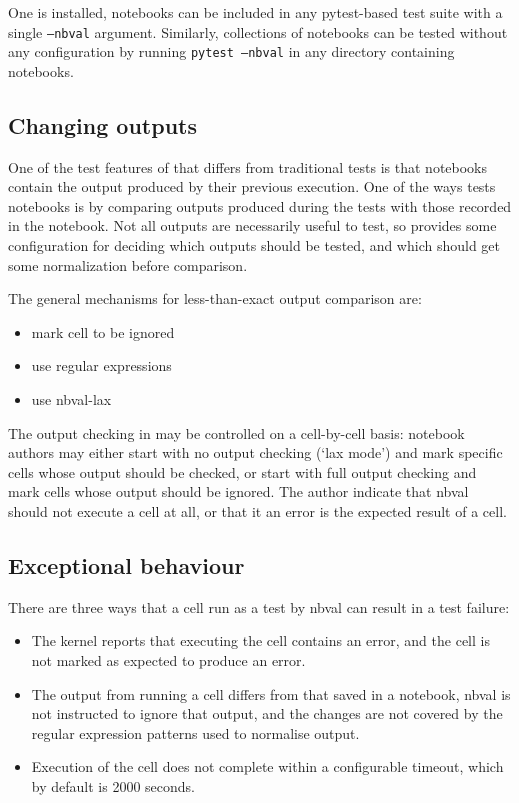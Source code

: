 \documentclass{deliverablereport}
\begin{document}
One \nbval is installed, notebooks can be included in any pytest-based test suite
with a single \texttt{--nbval} argument.
Similarly, collections of notebooks can be tested without any configuration by running
\texttt{pytest --nbval} in any directory containing notebooks.


\subsection{Changing outputs}\label{sec:changing-outputs}

One of the test features of \nbval that differs from traditional tests
is that notebooks contain the output produced by their previous execution.
One of the ways \nbval tests notebooks is by comparing outputs produced during the tests
with those recorded in the notebook.
Not all outputs are necessarily useful to test,
so \nbval provides some configuration for deciding which outputs should be tested,
and which should get some normalization before comparison.

The general mechanisms for less-than-exact output comparison are:

\begin{itemize}
\item mark cell to be ignored
\item use regular expressions
\item use nbval-lax
\end{itemize}

The output checking in \nbval may be controlled on a cell-by-cell
basis: notebook authors may either start with no output checking (`lax
mode') and mark specific cells whose output should be checked, or
start with full output checking and mark cells whose output should be
ignored.  The author indicate that nbval should not execute a cell at
all, or that it an error is the expected result of a cell.

\subsection{Exceptional behaviour}

There are three ways that a cell run as a test by nbval can result in a test
failure:

\begin{itemize}
\item The kernel reports that executing the cell contains an error,
and the cell is not marked as expected to produce an error.
\item The output from running a cell differs from that saved in a notebook,
nbval is not instructed to ignore that output,
and the changes are not covered by the regular expression patterns used to
normalise output.
\item Execution of the cell does not complete within a configurable timeout,
which by default is 2000 seconds.
\end{itemize}
\end{document}
